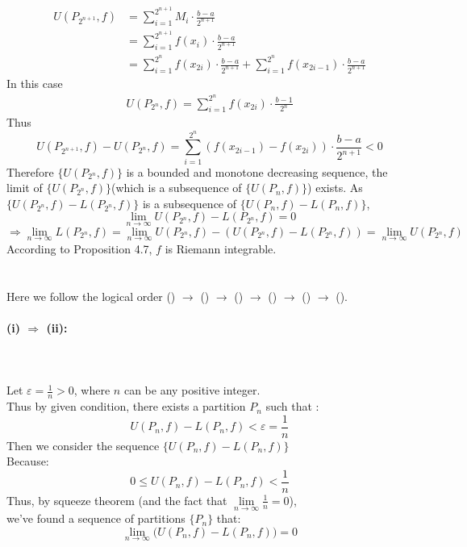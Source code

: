 \documentclass[11pt]{article}
\def\to{\rightarrow}
\def\imply{\Longrightarrow}
\def\oo{\infty}
\begin{document}
\begin{align*}    
U(P_{2^{n+1}},f)&=\sum_{i=1}^{2^{n+1}}M_i\cdot \frac{b-a}{2^{n+1}}
\\&=\sum_{i=1}^{2^{n+1}}f(x_i)\cdot\frac{b-a}{2^{n+1}}\\
&= \sum_{i=1}^{2^{n}}f(x_{2i})\cdot\frac{b-a}{2^{n+1}}+
\sum_{i=1}^{2^{n}}f(x_{2i-1})\cdot\frac{b-a}{2^{n+1}}
\end{align*}
In this case 
\begin{align*}    
    U(P_{2^{n}},f)=\sum_{i=1}^{2^n}f(x_{2i})\cdot\frac{b-1}{2^n}
\end{align*}
Thus 
$$U(P_{2^{n+1}},f)-U(P_{2^n},f)=\sum_{i=1}^{2^{n}}(f(x_{2i-1})-f(x_{2i}))\cdot\frac{b-a}{2^{n+1}}<0$$
Therefore $\{U(P_{2^n},f)\}$ is a bounded and monotone decreasing sequence, the limit of 
$\{U(P_{2^n},f)\}$(which is a subsequence of $\{U(P_n,f)\}$) exists.
As 
$\{U(P_{2^n},f)-L(P_{2^n},f)\}$ is a subsequence of $\{U(P_n,f)-L(P_n,f)\}$, 
$$\lim_{n\to\infty} U(P_{2^n},f) - L(P_{2^n},f) = 0$$
$$\imply \lim_{n\to\infty} L(P_{2^n},f) = \lim_{n\to\infty} U(P_{2^n},f) - \left( U(P_{2^n},f) - L(P_{2^n},f) \right) = \lim_{n\to\infty} U(P_{2^n},f)$$
According to Proposition 4.7, $f$ is Riemann integrable.

\section{}
Here we follow the logical order () $\to$ () $\to$ () $\to$ () $\to$ () $\to$ ().
\paragraph{(i) $\imply$ (ii): }~{}
\\\\
Let $\varepsilon=\frac{1}{n}>0$, where $n$ can be any positive integer. 
\\Thus by given condition, there exists a partition $P_n$ such that :
$$U(P_n, f)-L(P_n, f)<\varepsilon=\frac{1}{n}$$
Then we consider the sequence $\{U(P_n, f)-L(P_n, f)\}$
\\Because: 
$$0\le U(P_n, f)-L(P_n, f) < \frac{1}{n}$$
Thus, by squeeze theorem (and the fact that $\lim\limits_{n\to \oo}\frac{1}{n}=0$),
\\ we've found a sequence of partitions $\{P_n\}$ that: 
$$\lim\limits_{n\to \oo}\big(U(P_n, f)-L(P_n, f)\big)=0$$
\end{document}

